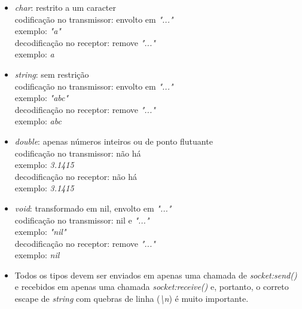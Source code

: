 \documentclass[11pt]{article}
\begin{document}
\begin{itemize}
\item
\textit{char}: restrito a um caracter \\
codificação no transmissor: envolto em \textit{"..."} \\
exemplo: \textit{"a"} \\
decodificação no receptor: remove \textit{"..."} \\
exemplo: \textit{a}
\item
\textit{string}: sem restrição \\
codificação no transmissor: envolto em \textit{"..."} \\
exemplo: \textit{"abc"} \\
decodificação no receptor: remove \textit{"..."} \\
exemplo: \textit{abc}
\item
\textit{double}: apenas números inteiros ou de ponto flutuante \\
codificação no transmissor: não há \\
exemplo: \textit{3.1415} \\
decodificação no receptor: não há \\
exemplo: \textit{3.1415}
\item
\textit{void}: transformado em nil, envolto em \textit{"..."} \\
codificação no transmissor: nil e \textit{"..."} \\
exemplo: \textit{"nil"} \\
decodificação no receptor: remove \textit{"..."} \\
exemplo: \textit{nil}
\item
Todos os tipos devem ser enviados em apenas uma chamada de
\textit{socket:send()} e recebidos em apenas uma chamada
\textit{socket:receive()} e, portanto, o correto escape de \textit{string} com
quebras de linha (\textit{\textbackslash{}n}) é muito importante.
\end{itemize}
\end{document}
